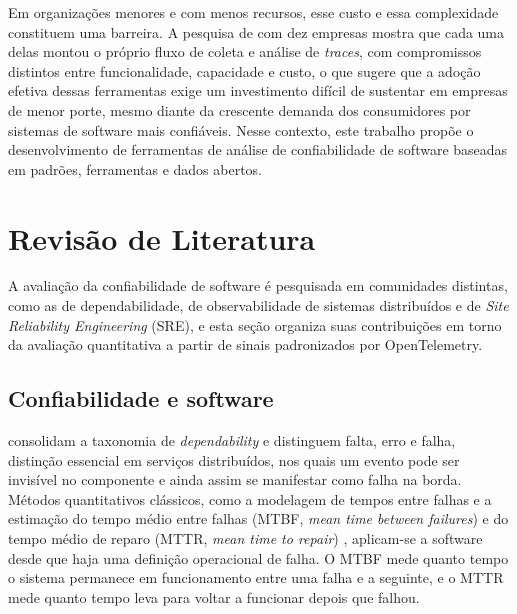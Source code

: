 \documentclass[12pt, a4paper, oneside]{article}
\begin{document}
Em organizações menores e com menos recursos, esse custo e essa complexidade constituem uma barreira. A pesquisa de  com dez empresas mostra que cada uma delas montou o próprio fluxo de coleta e análise de \textit{traces}, com compromissos distintos entre funcionalidade, capacidade e custo, o que sugere que a adoção efetiva dessas ferramentas exige um investimento difícil de sustentar em empresas de menor porte, mesmo diante da crescente demanda dos consumidores por sistemas de software mais confiáveis. Nesse contexto, este trabalho propõe o desenvolvimento de ferramentas de análise de confiabilidade de software baseadas em padrões, ferramentas e dados abertos.

\section{Revisão de Literatura}

A avaliação da confiabilidade de software é pesquisada em comunidades distintas, como as de dependabilidade, de observabilidade de sistemas distribuídos e de \textit{Site Reliability Engineering} (SRE), e esta seção organiza suas contribuições em torno da avaliação quantitativa a partir de sinais padronizados por OpenTelemetry.

\subsection{Confiabilidade e software}

 consolidam a taxonomia de \textit{dependability} e distinguem falta, erro e falha, distinção essencial em serviços distribuídos, nos quais um evento pode ser invisível no componente e ainda assim se manifestar como falha na borda. Métodos quantitativos clássicos, como a modelagem de tempos entre falhas e a estimação do tempo médio entre falhas (MTBF, \textit{mean time between failures}) e do tempo médio de reparo (MTTR, \textit{mean time to repair}) \cite{oconnor2012}, aplicam-se a software desde que haja uma definição operacional de falha. O MTBF mede quanto tempo o sistema permanece em funcionamento entre uma falha e a seguinte, e o MTTR mede quanto tempo leva para voltar a funcionar depois que falhou.
\end{document}
